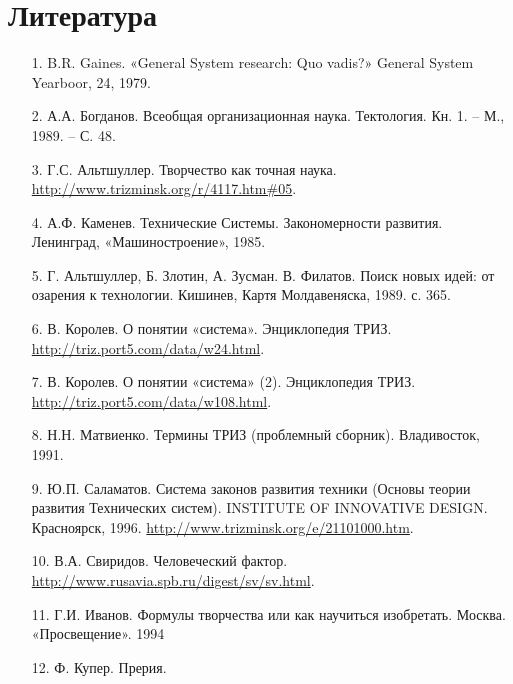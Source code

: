 \documentclass[11pt,a4paper]{article}
\begin{document}
\section*{Литература}
\begin{itemize}
\item[1.] B.R. Gaines. «General System research: Quo vadis?» General System
  Yearboor, 24, 1979.
\item[2.] А.А. Богданов. Всеобщая организационная наука. Тектология. Кн. 1. –
  М., 1989. – С. 48.
\item[3.] Г.С. Альтшуллер. Творчество как точная наука.
  \url{http://www.trizminsk.org/r/4117.htm#05}.
\item[4.] А.Ф. Каменев. Технические Системы. Закономерности развития.
  Ленинград, «Машиностроение», 1985.
\item[5.] Г. Альтшуллер, Б. Злотин, А. Зусман. В. Филатов. Поиск новых идей: от
  озарения к технологии. Кишинев, Картя Молдавеняска, 1989. с. 365.
\item[6.] В. Королев. О понятии «система». Энциклопедия ТРИЗ.
  \url{http://triz.port5.com/data/w24.html}.
\item[7.] В. Королев. О понятии «система» (2). Энциклопедия ТРИЗ.
  \url{http://triz.port5.com/data/w108.html}.
\item[8.] Н.Н. Матвиенко. Термины ТРИЗ (проблемный сборник).  Владивосток,
  1991.
\item[9.] Ю.П. Саламатов. Система законов развития техники (Основы теории
  развития Технических систем). INSTITUTE OF INNOVATIVE DESIGN. Красноярск,
  1996.  \url{http://www.trizminsk.org/e/21101000.htm}.
\item[10.] В.А. Свиридов. Человеческий фактор.
  \url{http://www.rusavia.spb.ru/digest/sv/sv.html}.
\item[11.] Г.И. Иванов. Формулы творчества или как научиться
  изобретать. Москва. «Просвещение». 1994
\item[12.] Ф. Купер. Прерия. 
\end{itemize}
\end{document}
